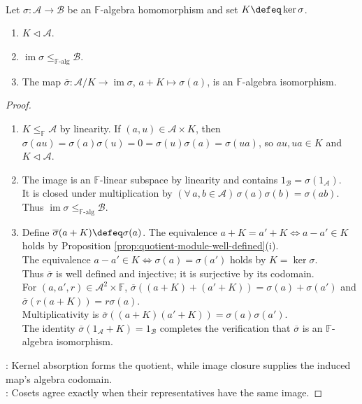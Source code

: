 \begin{proposition} \label{prop:algebra-kernel-first-isomorphism} \\
Let $\sigma:\mathcal{A}\to\mathcal{B}$ be an $\mathbb{F}$-algebra homomorphism and set $K\defeq\ker\sigma$.
\begin{enumerate}[label=(\roman*)]
\setlength{\itemsep}{0pt}
\item $K\triangleleft\mathcal{A}$.
\item $\operatorname{im}\sigma\leq_{\mathbb{F}\text{-alg}}\mathcal{B}$.
\item The map $\overline{\sigma}:\mathcal{A}/K\to\operatorname{im}\sigma$, $a+K\mapsto\sigma(a)$, is an $\mathbb{F}$-algebra isomorphism.
\end{enumerate}
\begin{proof}
\begin{enumerate}[label=(\roman*)]
\setlength{\itemsep}{0pt}
\item $K\leq_{\mathbb{F}}\mathcal{A}$ by linearity. If $(a,u)\in\mathcal{A}\times K$, then $\sigma(au)=\sigma(a)\sigma(u)=0=\sigma(u)\sigma(a)=\sigma(ua)$, so $au,ua\in K$ and $K\triangleleft\mathcal{A}$.
\item The image is an $\mathbb{F}$-linear subspace by linearity and contains $1_{\mathcal{B}}=\sigma(1_{\mathcal{A}})$.\\
It is closed under multiplication by $(\forall\,a,b\in\mathcal{A})\,\sigma(a)\sigma(b)=\sigma(ab)$. Thus $\operatorname{im}\sigma\leq_{\mathbb{F}\text{-alg}}\mathcal{B}$.
\item Define $\overline{\sigma}(a+K)\defeq\sigma(a)$. The equivalence $a+K=a'+K\Longleftrightarrow a-a'\in K$ holds by Proposition \ref{prop:quotient-module-well-defined}(i).\\
The equivalence $a-a'\in K\Longleftrightarrow\sigma(a)=\sigma(a')$ holds by $K=\ker\sigma$.\\
Thus $\overline{\sigma}$ is well defined and injective; it is surjective by its codomain.\\
For $(a,a',r)\in\mathcal{A}^2\times\mathbb{F}$, $\overline{\sigma}((a+K)+(a'+K))=\sigma(a)+\sigma(a')$ and $\overline{\sigma}(r(a+K))=r\sigma(a)$.\\
Multiplicativity is $\overline{\sigma}((a+K)(a'+K))=\sigma(a)\sigma(a')$.\\
The identity $\overline{\sigma}(1_{\mathcal{A}}+K)=1_{\mathcal{B}}$ completes the verification that $\overline{\sigma}$ is an $\mathbb{F}$-algebra isomorphism.
\end{enumerate}
: Kernel absorption forms the quotient, while image closure supplies the induced map's algebra codomain.\\
: Cosets agree exactly when their representatives have the same image.
\end{proof}
\end{proposition}

